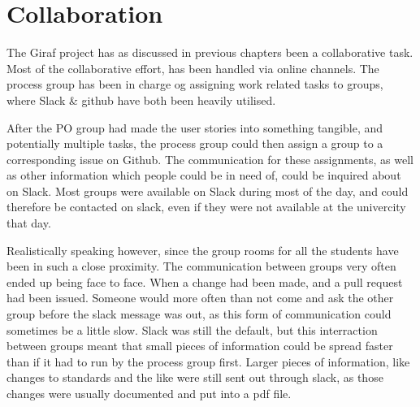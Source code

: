 \section{Collaboration}
The Giraf project has as discussed in previous chapters been a collaborative task.
Most of the collaborative effort, has been handled via online channels.
The process group has been in charge og assigning work related tasks to groups, where Slack \& github have both been heavily utilised.

After the PO group had made the user stories into something tangible, and potentially multiple tasks, the process group could then assign a group to a corresponding issue on Github.
The communication for these assignments, as well as other information which people could be in need of, could be inquired about on Slack.
Most groups were available on Slack during most of the day, and could therefore be contacted on slack, even if they were not available at the univercity that day.

Realistically speaking however, since the group rooms for all the students have been in such a close proximity.
The communication between groups very often ended up being face to face.
When a change had been made, and a pull request had been issued.
Someone would more often than not come and ask the other group before the slack message was out, as this form of communication could sometimes be a little slow.
Slack was still the default, but this interraction between groups meant that small pieces of information could be spread faster than if it had to run by the process group first.
Larger pieces of information, like changes to standards and the like were still sent out through slack, as those changes were usually documented and put into a pdf file.

